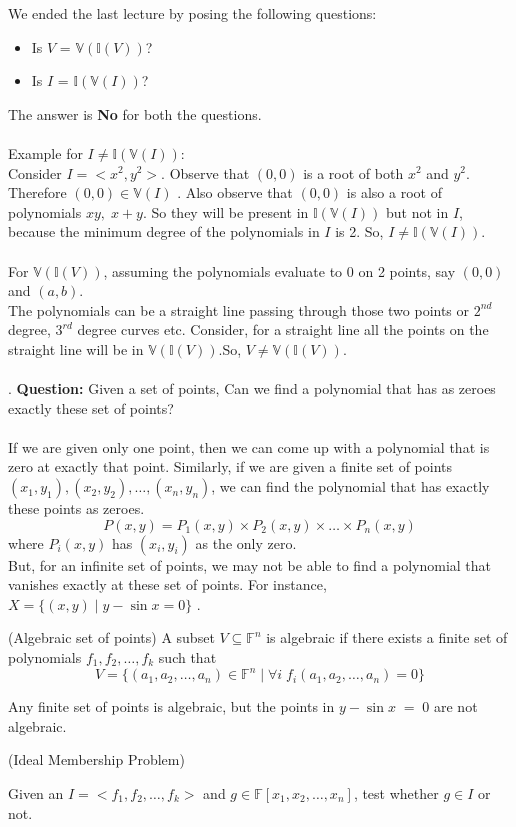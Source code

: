 We ended the last lecture by posing the following questions:
\begin{itemize}
\item Is $V$ = $\mathbb{V}(\mathbb{I}(V))$?
\item Is $I$ = $\mathbb{I}(\mathbb{V}(I))$?
\end{itemize}
The answer is \textbf{No} for both the questions.\\\\
Example for $I\neq\mathbb{I}(\mathbb{V}(I))$:\\

Consider $I = <x^2,y^2>$. Observe that $(0,0)$ is a root of both $x^2$ and $y^2$. Therefore $(0,0)\in\mathbb{V}(I)$ . Also observe that $(0,0)$ is also a root of polynomials $xy,\;x+y$. So they will be present in $\mathbb{I}(\mathbb{V}(I))$ but not in $I$, because the minimum degree of the polynomials in $I$ is 2. So, $I\neq\mathbb{I}(\mathbb{V}(I))$.\\\\
For $\mathbb{V}(\mathbb{I}(V))$, assuming the polynomials evaluate to 0 on 2 points, say $(0,0)$ and $(a,b)$.\\
The polynomials can be a straight line passing through those two points or $2^{nd}$ degree, $3^{rd}$ degree curves etc. Consider, for a straight line all the points on the straight line will be in $\mathbb{V}(\mathbb{I}(V))$.So, $V \neq \mathbb{V}(\mathbb{I}(V))$.\\\\
. 
\textbf{Question:} Given a set of points, Can we find a polynomial that has as zeroes exactly  these set of points?\\\\
If we are given only one point, then we can come up with a polynomial that is zero at exactly that point. Similarly, if we are given a finite set of points $(x_1,y_1), (x_2,y_2), \ldots,(x_n,y_n)$, we can find the polynomial that has exactly these points as zeroes.
$$P(x,y) = P_1(x,y)\times P_2(x,y)\times \ldots \times P_n(x,y)$$
where $P_i(x,y)$ has $(x_i,y_i)$ as the only zero.\\
But, for an infinite set of points, we may not be able to find a polynomial that vanishes exactly at these set of points. For instance, $X=\{(x,y)\;|\;y - \sin x=0\}$ .
\begin{definition}(Algebraic set of points)
A subset $V \subseteq \mathbb{F}^n$ is algebraic if there exists a finite set of polynomials $f_1,f_2,\ldots,f_k$ such that 
$$
	V = \{(a_1, a_2, \ldots, a_n) \in \mathbb{F}^n \;|\; \forall i\; f_i(a_1, a_2, \ldots, a_n) = 0\}
$$
\end{definition}
Any finite set of points is algebraic, but the points in $y-\sin x\;=\;0$ are not algebraic.\\
\begin{problem}(Ideal Membership Problem)

\end{problem}
Given an $I = <f_1,f_2, \ldots, f_k>$ and $g \in \mathbb{F}[x_1,x_2,\ldots,x_n]$, test whether $g\in I$ or not.



